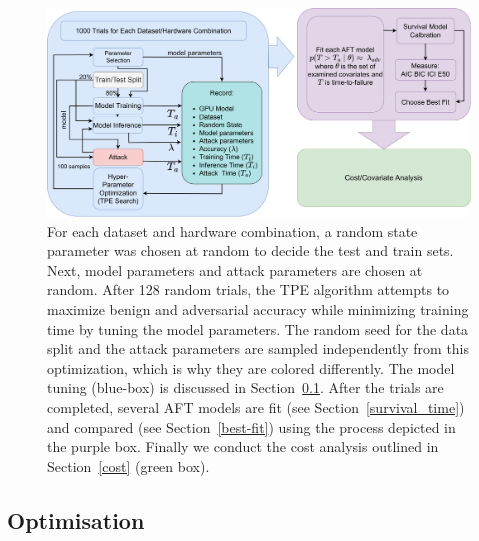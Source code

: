 \documentclass[sn-mathphys-num]{sn-jnl}%
\begin{document}
\begin{figure}
    \centering
    \includegraphics[width=\textwidth]{plots/experiment.pdf}
    \caption{For each dataset and hardware combination, a random state parameter was chosen at random to decide the test and train sets. Next, model parameters and attack parameters are chosen at random. After 128 random trials, the TPE algorithm attempts to maximize benign and adversarial accuracy while minimizing training time by tuning the model parameters. The random seed for the data split and the attack parameters are sampled independently from this optimization, which is why they are colored differently. The model tuning (blue-box) is discussed in Section~\ref{optimisation}. After the trials are completed, several AFT models are fit (see Section~\ref{survival_time}) and compared (see Section~\ref{best-fit}) using the process depicted in the purple box. Finally we conduct the cost analysis outlined in Section~\ref{cost} (green box).}
    \label{fig:experiments}
\end{figure}



\subsection{Optimisation}
\label{optimisation}
\end{document}
